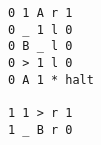 \begin{verbatim}
0 1 A r 1
0 _ 1 l 0
0 B _ l 0
0 > 1 l 0
0 A 1 * halt

1 1 > r 1
1 _ B r 0
\end{verbatim}
